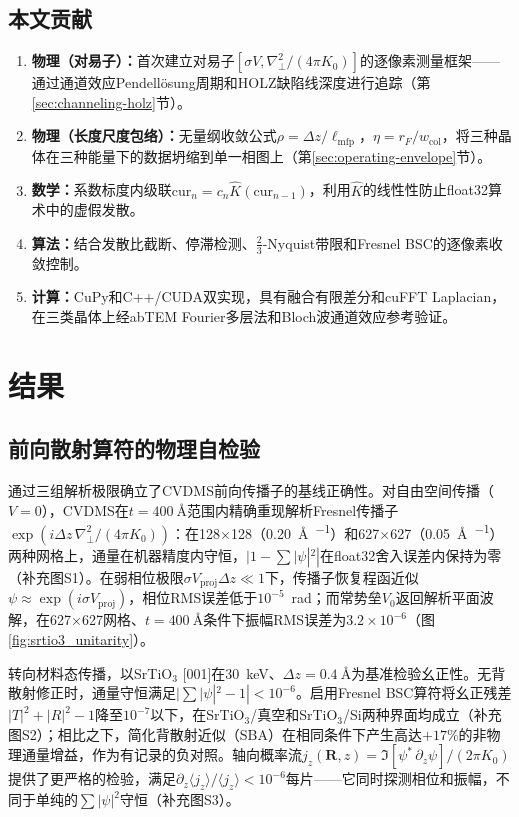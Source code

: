 \documentclass[twoside,11pt]{ctexart}
\begin{document}
\subsection{本文贡献}
\begin{enumerate}
\item \textbf{物理（对易子）：}首次建立对易子$[\sigma V,\nabla_\perp^2/(4\pi K_0)]$的逐像素测量框架——通过通道效应Pendell\"osung周期和HOLZ缺陷线深度进行追踪（第\ref{sec:channeling-holz}节）。
\item \textbf{物理（长度尺度包络）：}无量纲收敛公式$\rho=\Delta z/\ell_\text{mfp}$，$\eta=r_F/w_\text{col}$，将三种晶体在三种能量下的数据坍缩到单一相图上（第\ref{sec:operating-envelope}节）。
\item \textbf{数学：}系数标度内级联$\text{cur}_n=c_n\hat{K}(\text{cur}_{n-1})$，利用$\hat{K}$的线性性防止float32算术中的虚假发散。
\item \textbf{算法：}结合发散比截断、停滞检测、$\tfrac23$-Nyquist带限和Fresnel BSC的逐像素收敛控制。
\item \textbf{计算：}CuPy和C++/CUDA双实现，具有融合有限差分和cuFFT Laplacian，在三类晶体上经abTEM Fourier多层法和Bloch波通道效应参考验证。
\end{enumerate}

\section{结果}

\subsection{前向散射算符的物理自检验}\label{sec:self-tests}

通过三组解析极限确立了CVDMS前向传播子的基线正确性。对自由空间传播（$V=0$），CVDMS在$t=\SI{400}{\angstrom}$范围内精确重现解析Fresnel传播子$\exp(i\Delta z\,\nabla_\perp^2/(4\pi K_0))$：在128$\times$128（\SI{0.20}{\angstrom\per\pixel}）和627$\times$627（\SI{0.05}{\angstrom\per\pixel}）两种网格上，通量在机器精度内守恒，$|1-\sum|\psi|^2|$在float32舍入误差内保持为零（补充图S1）。在弱相位极限$\sigma V_\text{proj}\Delta z\ll1$下，传播子恢复程函近似$\psi\approx\exp(i\sigma V_\text{proj})$，相位RMS误差低于$10^{-5}$~rad；而常势垒$V_0$返回解析平面波解，在627$\times$627网格、$t=\SI{400}{\angstrom}$条件下振幅RMS误差为$3.2\times10^{-6}$（图\ref{fig:srtio3_unitarity}）。

转向材料态传播，以SrTiO$_3$ [001]在\SI{30}{\keV}、$\Delta z=\SI{0.4}{\angstrom}$为基准检验幺正性。无背散射修正时，通量守恒满足$|\sum|\psi|^2-1|<10^{-6}$。启用Fresnel BSC算符将幺正残差$|T|^2+|R|^2-1$降至$10^{-7}$以下，在SrTiO$_3$/真空和SrTiO$_3$/Si两种界面均成立（补充图S2）；相比之下，简化背散射近似（SBA）在相同条件下产生高达$+17\%$的非物理通量增益，作为有记录的负对照。轴向概率流$j_z(\mathbf{R},z)=\Im[\psi^*\,\partial_z\psi]/(2\pi K_0)$提供了更严格的检验，满足$\partial_z\langle j_z\rangle/\langle j_z\rangle<10^{-6}$每片——它同时探测相位和振幅，不同于单纯的$\sum|\psi|^2$守恒（补充图S3）。
\end{document}
